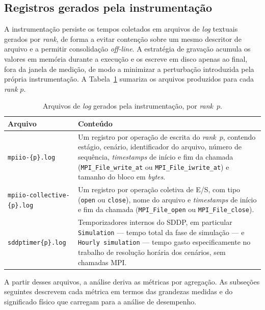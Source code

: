 \subsection{Registros gerados pela instrumentação}
\label{sec:logs_instrumentacao}

A instrumentação persiste os tempos coletados em arquivos de \textit{log}
textuais gerados por \textit{rank}, de forma a evitar contenção sobre um
mesmo descritor de arquivo e a permitir consolidação \textit{off-line}. A
estratégia de gravação acumula os valores em memória durante a execução
e os escreve em disco apenas ao final, fora da janela de medição, de
modo a minimizar a perturbação introduzida pela própria instrumentação.
A Tabela~\ref{tab:logs_instrumentacao} sumariza os arquivos produzidos
para cada \textit{rank} $p$.

\begin{table}[H]
\centering
\caption{Arquivos de \textit{log} gerados pela instrumentação, por
\textit{rank}~$p$.}
\label{tab:logs_instrumentacao}
\small
\renewcommand{\arraystretch}{1.2}
\begin{tabular}{p{} p{}}
\toprule
\textbf{Arquivo} & \textbf{Conteúdo} \\
\midrule
\texttt{mpiio-\{p\}.log} &
Um registro por operação de escrita do \textit{rank}~$p$, contendo
estágio, cenário, identificador do arquivo, número de sequência,
\textit{timestamps} de início e fim da chamada
(\texttt{MPI\_File\_write\_at} ou \texttt{MPI\_File\_iwrite\_at}) e
tamanho do bloco em \textit{bytes}. \\
\texttt{mpiio-collective-\{p\}.log} &
Um registro por operação coletiva de E/S, com tipo (\texttt{open} ou
\texttt{close}), nome do arquivo e \textit{timestamps} de início e fim
da chamada (\texttt{MPI\_File\_open} ou \texttt{MPI\_File\_close}). \\
\texttt{sddptimer\{p\}.log} &
Temporizadores internos do SDDP, em particular \texttt{Simulation} ---
tempo total da fase de simulação --- e \texttt{Hourly simulation} ---
tempo gasto especificamente no trabalho de resolução horária dos
cenários, sem chamadas MPI. \\
\bottomrule
\end{tabular}
\end{table}

A partir desses arquivos, a análise deriva as métricas por agregação. As
subseções seguintes descrevem cada métrica em termos das grandezas
medidas e do significado físico que carregam para a análise de
desempenho.

